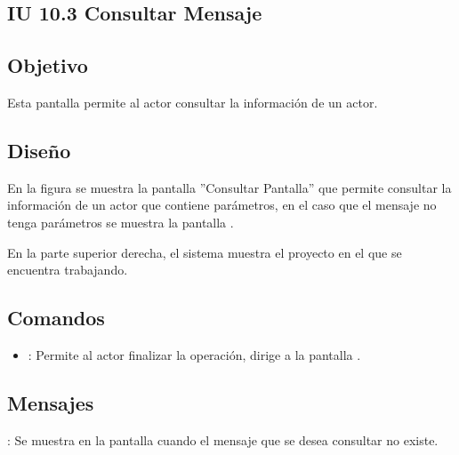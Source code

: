 \subsection{IU 10.3 Consultar Mensaje}

\subsection{Objetivo}
	Esta pantalla permite al actor consultar la información de un actor.
\subsection{Diseño}
	En la figura  se muestra la pantalla ''Consultar Pantalla'' que permite consultar la información de un actor que contiene parámetros, en el caso que el mensaje no tenga parámetros se muestra la pantalla .
	
	En la parte superior derecha, el sistema muestra el proyecto en el que se encuentra trabajando.

\subsection{Comandos}
\begin{itemize}
	\item {}: Permite al actor finalizar la operación, dirige a la pantalla .
\end{itemize}

\subsection{Mensajes}

\begin{Citemize}
	\item {}: Se muestra en la pantalla  cuando el mensaje que se desea consultar no existe.
\end{Citemize}
